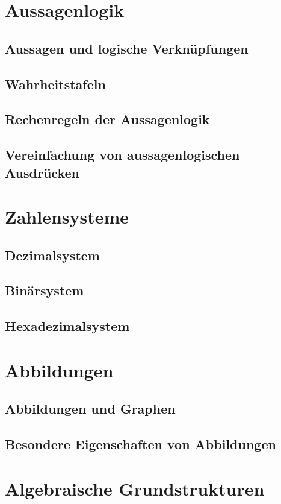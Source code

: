 \documentclass[a4paper,10pt]{article}
\begin{document}
\section{Aussagenlogik}
\subsection{Aussagen und logische Verknüpfungen}
\subsection{Wahrheitstafeln}
\subsection{Rechenregeln der Aussagenlogik}
\subsection{Vereinfachung von aussagenlogischen Ausdrücken}




\section{Zahlensysteme}
\subsection{Dezimalsystem}
\subsection{Binärsystem}
\subsection{Hexadezimalsystem}




\section{Abbildungen}
\subsection{Abbildungen und Graphen}
\subsection{Besondere Eigenschaften von Abbildungen}




\section{Algebraische Grundstrukturen}
\end{document}
